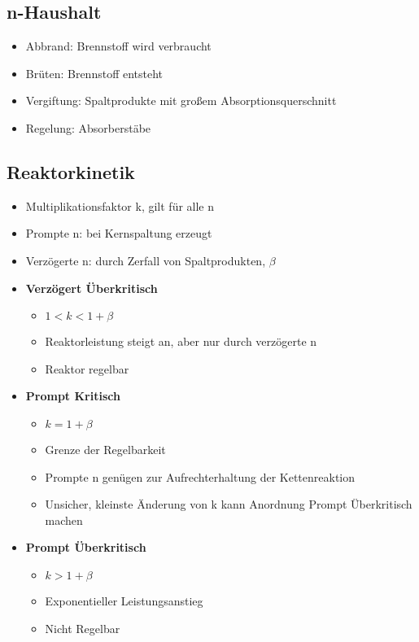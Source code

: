 \documentclass[12pt]{article}
\begin{document}
\subsection{n-Haushalt}
\begin{itemize}
  \item Abbrand: Brennstoff wird verbraucht
  \item Brüten: Brennstoff entsteht
  \item Vergiftung: Spaltprodukte mit großem Absorptionsquerschnitt
  \item Regelung: Absorberstäbe
\end{itemize}

\subsection{Reaktorkinetik}
\begin{itemize}
  \item Multiplikationsfaktor k, gilt für alle n
  \item Prompte n: bei Kernspaltung erzeugt
  \item Verzögerte n: durch Zerfall von Spaltprodukten, \(\beta\)
  \item \textbf{Verzögert Überkritisch}
  \begin{itemize}
    \item \(1 < k < 1 + \beta\)
    \item Reaktorleistung steigt an, aber nur durch verzögerte n
    \item Reaktor regelbar
  \end{itemize}
  \item \textbf{Prompt Kritisch}
  \begin{itemize}
    \item \(k = 1 + \beta\)
    \item Grenze der Regelbarkeit
    \item Prompte n genügen zur Aufrechterhaltung der Kettenreaktion
    \item Unsicher, kleinste Änderung von k kann Anordnung Prompt Überkritisch machen
  \end{itemize}
  \item \textbf{Prompt Überkritisch}
  \begin{itemize}
    \item \(k > 1 + \beta\)
    \item Exponentieller Leistungsanstieg
    \item Nicht Regelbar
  \end{itemize}
\end{itemize}
\end{document}
